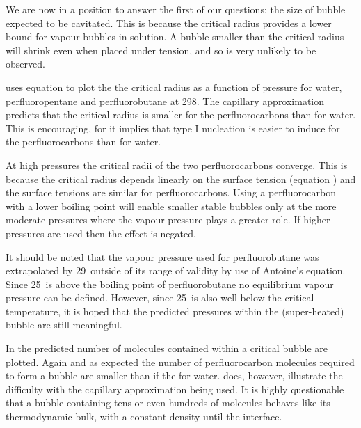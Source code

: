We are now in a position to answer the first of our questions: the size of bubble expected to be cavitated.
This is because the critical radius provides  a lower bound for vapour bubbles in solution.
A bubble smaller than the critical radius will shrink even when  placed under tension,
and so is very unlikely to be observed.  


 uses equation  to plot the the critical radius as a function of pressure  for water, perfluoropentane and perfluorobutane
at  \unit{298}\kelvin.
The capillary approximation predicts that the critical radius is smaller for the perfluorocarbons than for water.
This is  encouraging, for it implies that type I nucleation is easier to induce for the perfluorocarbons than for water.

At high pressures the critical radii of the two perfluorocarbons converge.
This is because the critical radius depends linearly on the surface tension (equation )
and the surface tensions are similar for perfluorocarbons.
Using a perfluorocarbon with a lower boiling point will enable smaller stable bubbles only at the more moderate  pressures where the vapour pressure plays a greater role.  
If higher pressures are used then the effect is negated.

It should be noted that the vapour pressure used for perfluorobutane was extrapolated by \unit{29}\degreecelsius\  outside of its range of validity\cite{NISTdata}
 by use of Antoine's equation.
Since \unit{25}\degreecelsius\ is above the boiling point of perfluorobutane no  equilibrium vapour pressure can be defined.
However, since \unit{25}\degreecelsius\ is also well below the critical temperature, %
it is hoped that the predicted pressures within the (super-heated) bubble are still meaningful.


In   the predicted number of molecules contained within a critical bubble are plotted.
Again and as expected the number of perfluorocarbon molecules required to form a bubble are smaller than if the for water.
 does, however, illustrate  the difficulty with the capillary approximation being used.
It is highly questionable that a bubble containing tens or even hundreds of molecules behaves like its thermodynamic bulk, with a constant density until the interface.


